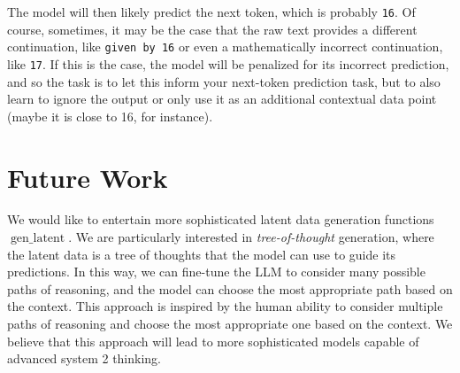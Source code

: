 \documentclass[
]{article}
\begin{document}
The model will then likely predict the next token, which is probably
\texttt{16}. Of course, sometimes, it may be the case that the raw text
provides a different continuation, like \texttt{given\ by\ 16} or even a
mathematically incorrect continuation, like \texttt{17}. If this is the
case, the model will be penalized for its incorrect prediction, and so
the task is to let this inform your next-token prediction task, but to
also learn to ignore the output or only use it as an additional
contextual data point (maybe it is close to 16, for instance).

\hypertarget{future-work}{%
\section{Future Work}\label{future-work}}

We would like to entertain more sophisticated latent data generation
functions \(\operatorname{gen\_latent}\). We are particularly interested
in \emph{tree-of-thought} generation, where the latent data is a tree of
thoughts that the model can use to guide its predictions. In this way,
we can fine-tune the LLM to consider many possible paths of reasoning,
and the model can choose the most appropriate path based on the context.
This approach is inspired by the human ability to consider multiple
paths of reasoning and choose the most appropriate one based on the
context. We believe that this approach will lead to more sophisticated
models capable of advanced system 2 thinking.
\end{document}
